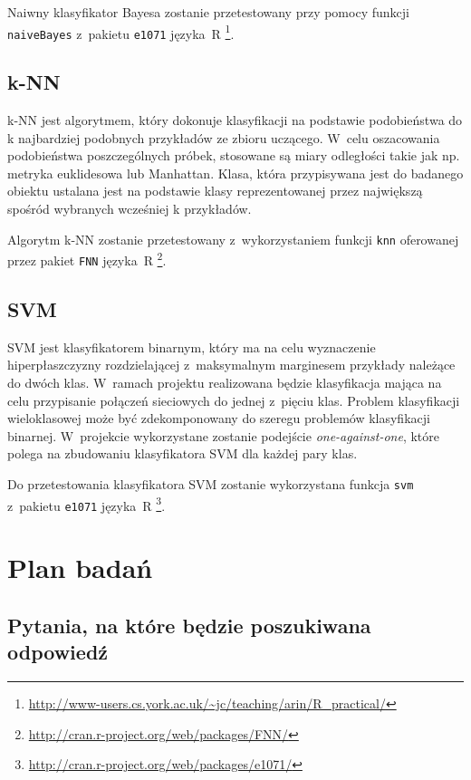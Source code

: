 \documentclass[a4paper, 12pt]{article}
\begin{document}
Naiwny klasyfikator Bayesa zostanie przetestowany przy pomocy funkcji \texttt{naiveBayes} z~pakietu \texttt{e1071} języka~R
\footnote{\url{http://www-users.cs.york.ac.uk/~jc/teaching/arin/R_practical/}}.

\subsection{k-NN}
k-NN jest algorytmem, który dokonuje klasyfikacji na podstawie podobieństwa do k najbardziej podobnych przykładów ze zbioru uczącego. W~celu oszacowania podobieństwa poszczególnych próbek, stosowane są miary odległości takie jak np. metryka euklidesowa lub Manhattan. Klasa, która przypisywana jest do badanego obiektu ustalana jest na podstawie klasy reprezentowanej przez największą spośród wybranych wcześniej k przykładów.

Algorytm k-NN zostanie przetestowany z~wykorzystaniem funkcji \texttt{knn} oferowanej przez pakiet \texttt{FNN} języka~R \footnote{\url{http://cran.r-project.org/web/packages/FNN/}}.

\subsection{SVM}
SVM jest klasyfikatorem binarnym, który ma na celu wyznaczenie hiperpłaszczyzny rozdzielającej z~maksymalnym marginesem przykłady należące do dwóch klas. W~ramach projektu realizowana będzie klasyfikacja mająca na celu przypisanie połączeń sieciowych do jednej z~pięciu klas. Problem klasyfikacji wieloklasowej może być zdekomponowany do szeregu problemów klasyfikacji binarnej. W~projekcie wykorzystane zostanie podejście \textit{one-against-one}, które polega na zbudowaniu klasyfikatora SVM dla każdej pary klas. 

Do przetestowania klasyfikatora SVM zostanie wykorzystana funkcja \texttt{svm} z~pakietu \texttt{e1071} języka~R \footnote{\url{http://cran.r-project.org/web/packages/e1071/}}.

\section{Plan badań}

\subsection{Pytania, na które będzie poszukiwana odpowiedź}
\end{document}
